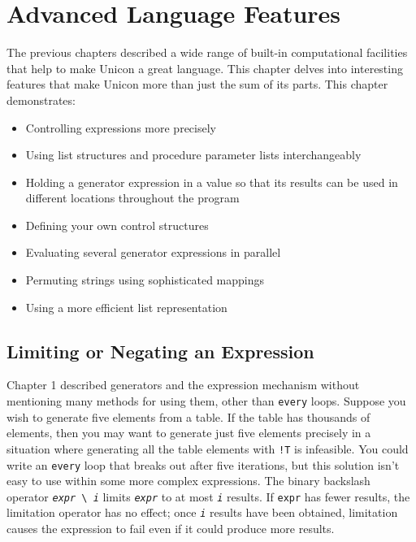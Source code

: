 \chapter{Advanced Language Features}

The previous chapters described a wide range of built-in computational
facilities that help to make Unicon a great language.
This chapter delves into interesting features that make Unicon
more than just the sum of its parts. This chapter demonstrates:

\begin{itemize}\itemsep0pt
\item Controlling expressions more precisely
\item Using list structures and procedure parameter lists
interchangeably
\item Holding a generator expression in a value so that
its results can be used in different locations throughout the program
\item Defining your own control structures
\item Evaluating several generator expressions in parallel
\item Permuting strings using sophisticated mappings
\item Using a more efficient list representation
\end{itemize}

\section{Limiting or Negating an Expression}

Chapter 1 described generators and the
expression mechanism without mentioning many methods for using them,
other than \texttt{every} loops. Suppose you wish to generate five
elements from a table. If the table has thousands of elements, then you
may want to generate just five elements precisely in a situation where
generating all the table elements with \texttt{!T} is infeasible. You
could write an \texttt{every} loop that breaks out after five
iterations, but this solution isn't easy to use within
some more complex expressions. The binary backslash operator
\texttt{\textit{expr}}\texttt{ {\textbackslash} }\texttt{\textit{i}}
limits \texttt{\textit{expr}} to at most \texttt{\textit{i}} results.
If \texttt{expr} has fewer results, the limitation operator has no
effect; once \texttt{\textit{i}} results have been obtained, limitation
causes the expression to fail even if it
could produce more results.

